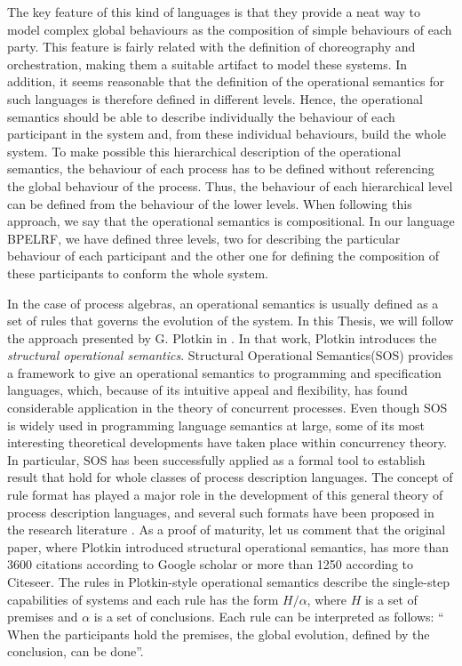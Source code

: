 The key feature of this kind of languages is that they provide a neat way to model complex global behaviours as the composition of 
simple behaviours of each party. This feature is fairly related with the definition of choreography and orchestration, making them 
a suitable artifact to model these systems. In addition, it seems reasonable that the definition of
the operational semantics for such languages is therefore defined in different levels. Hence, 
the operational semantics should be able to describe individually the
behaviour of each participant in the system and, from these individual behaviours, build the whole system. 
To make possible this hierarchical description of the operational semantics,
the behaviour of each process has to be defined without referencing the global behaviour of the process. 
Thus, the behaviour of each hierarchical level can be defined from the behaviour 
of the lower levels. When following this approach, we say that the operational semantics is compositional. 
In our language BPELRF, we have defined three levels, two for describing
the particular behaviour of each participant and the other one for defining the composition of these participants 
to conform the whole system.

In the case of process algebras, an operational semantics is usually defined as a set of rules 
that governs the evolution of the system. In this Thesis, we will follow the approach presented by G. Plotkin
in \cite{Plotkin81}. In that work, Plotkin introduces the \emph{structural operational semantics}.
Structural Operational Semantics(SOS)
provides a framework to give an operational
semantics to programming and specification languages,
which, because of its intuitive appeal and flexibility,
has found considerable application in the theory of concurrent
processes. Even though SOS is widely used in programming language semantics
at large, some of its most interesting theoretical developments have taken place
within concurrency theory. In particular, SOS has been successfully applied
as a formal tool to establish result that hold for whole classes of process description
languages. The concept of rule format has
played a major role in the development of
this general theory of process description
languages, and several such formats
have been proposed in the research literature \cite{aceto1999}. As a proof of maturity, let us comment that
the original paper, where Plotkin introduced structural operational semantics, 
has more than 3600 citations according to Google scholar or more than 1250 according to
Citeseer. The rules in Plotkin-style operational semantics describe the single-step capabilities of systems 
and each rule has the form $H/\alpha$, where $H$ is a set of premises and $\alpha$ is a set of conclusions.
Each rule can be interpreted as follows: `` When the participants hold the premises, 
the global evolution, defined by the conclusion, can be done''. 

